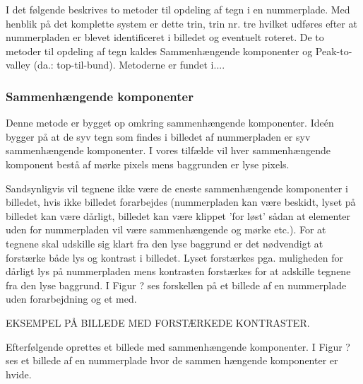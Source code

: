 \begin{comment}
Se nrpl.dk: Hvert af de op til 7 tegn på nummerpladen har et imaginært "felt" de kan brede sig i. Ikke alle tegn er lige brede, og generelt er bogstaver bredere end tal. "Feltet" til bogstaver er derfor bredere end feltet til tegn. Enkelte tegn er for smalle til at udfylde deres "felt", så designeren har fundet det hensigtsmæssigt at placere disse tegn visuelt centreret inden for deres "felt".

"Således vil en nummerplade som MB 20 001 på grund af venstrestillingen af det sidste 1-tal have større mellemrum mellem højre kant og sidste tal end mellem venstre kant og første bogstav"
\end{comment}

I det følgende beskrives to metoder til opdeling af tegn i en nummerplade. Med henblik på det komplette system er dette trin, trin nr. tre hvilket udføres efter at nummerpladen er blevet identificeret i billedet og eventuelt roteret. De to metoder til opdeling af tegn kaldes Sammenhængende komponenter og Peak-to-valley (da.: top-til-bund). Metoderne er fundet i....



\subsubsection*{Sammenhængende komponenter}
Denne metode er bygget op omkring sammenhængende komponenter. Ideén bygger på at de syv tegn som findes i billedet af nummerpladen er syv sammenhængende komponenter. I vores tilfælde vil hver sammenhængende komponent bestå af mørke pixels mens baggrunden er lyse pixels.

Sandsynligvis vil tegnene ikke være de eneste sammenhængende komponenter i billedet, hvis ikke billedet forarbejdes (nummerpladen kan være beskidt, lyset på billedet kan være dårligt, billedet kan være klippet 'for løst' sådan at elementer uden for nummerpladen vil være sammenhængende og mørke etc.). For at tegnene skal udskille sig klart fra den lyse baggrund er det nødvendigt at forstærke både lys og kontrast i billedet. Lyset forstærkes pga. muligheden for dårligt lys på nummerpladen mens kontrasten forstærkes for at adskille tegnene fra den lyse baggrund. I Figur ? ses forskellen på et billede af en nummerplade uden forarbejdning og et med.

EKSEMPEL PÅ BILLEDE MED FORSTÆRKEDE KONTRASTER.

Efterfølgende oprettes et billede med sammenhængende komponenter. I Figur ? ses et billede af en nummerplade hvor de sammen hængende komponenter er hvide.

